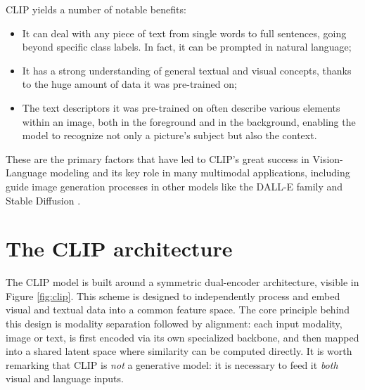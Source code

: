\documentclass[a4paper, oneside, english]{sapthesis} %
\begin{document}
CLIP yields a number of notable benefits:

\begin{itemize}
    \item It can deal with any piece of text from single words to full sentences, going beyond specific class labels. In fact, it can be prompted in natural language;
    \item It has a strong understanding of general textual and visual concepts, thanks to the huge amount of data it was pre-trained on;
    \item The text descriptors it was pre-trained on often describe various elements within an image, both in the foreground and in the background, enabling the model to recognize not only a picture's subject but also the context.
\end{itemize}

These are the primary factors that have led to CLIP's great success in Vision-Language modeling and its key role in many multimodal applications, including guide image generation processes in other models like the DALL-E family \cite{ramesh2022hierarchical} and Stable Diffusion \cite{rombach2022high}.


\section{The CLIP architecture}

The CLIP model is built around a symmetric dual-encoder architecture, visible in Figure \ref{fig:clip}. This scheme is designed to independently process and embed visual and textual data into a common feature space. The core principle behind this design is modality separation followed by alignment: each input modality, image or text, is first encoded via its own specialized backbone, and then mapped into a shared latent space where similarity can be computed directly. It is worth remarking that CLIP is \textit{not} a generative model: it is necessary to feed it \textit{both} visual and language inputs.
\end{document}
